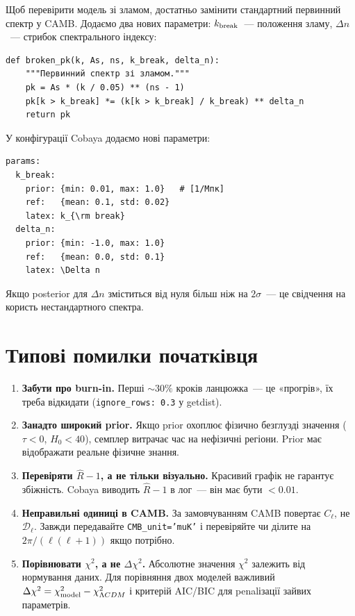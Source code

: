 Щоб перевірити модель зі зламом, достатньо замінити стандартний
первинний спектр у CAMB. Додаємо два нових параметри:
$k_{\rm break}$~--- положення зламу, $\Delta n$~--- стрибок
спектрального індексу:

\begin{verbatim}
def broken_pk(k, As, ns, k_break, delta_n):
    """Первинний спектр зі зламом."""
    pk = As * (k / 0.05) ** (ns - 1)
    pk[k > k_break] *= (k[k > k_break] / k_break) ** delta_n
    return pk
\end{verbatim}

У конфігурації Cobaya додаємо нові параметри:
\begin{verbatim}
params:
  k_break:
    prior: {min: 0.01, max: 1.0}   # [1/Мпк]
    ref:   {mean: 0.1, std: 0.02}
    latex: k_{\rm break}
  delta_n:
    prior: {min: -1.0, max: 1.0}
    ref:   {mean: 0.0, std: 0.1}
    latex: \Delta n
\end{verbatim}

Якщо posterior для $\Delta n$ зміститься від нуля більш ніж
на $2\sigma$~--- це свідчення на користь нестандартного спектра.

\section{Типові помилки початківця}

\begin{enumerate}
  \item \textbf{Забути про burn-in.} Перші $\sim 30\%$ кроків
        ланцюжка~--- це «прогрів», їх треба відкидати
        (\texttt{ignore\_rows: 0.3} у getdist).

  \item \textbf{Занадто широкий prior.} Якщо prior охоплює
        фізично безглузді значення ($\tau < 0$, $H_0 < 40$),
        семплер витрачає час на нефізичні регіони. Prior має
        відображати реальне фізичне знання.

  \item \textbf{Перевіряти $\hat{R}-1$, а не тільки візуально.}
        Красивий графік не гарантує збіжність. Cobaya виводить
        $\hat{R}-1$ в лог~--- він має бути $< 0.01$.

  \item \textbf{Неправильні одиниці в CAMB.} За замовчуванням
        CAMB повертає $C_\ell$, не $\mathcal{D}_\ell$. Завжди
        передавайте \texttt{CMB\_unit='muK'} і перевіряйте
        чи ділите на $2\pi/(\ell(\ell+1))$ якщо потрібно.

  \item \textbf{Порівнювати $\chi^2$, а не $\Delta\chi^2$.}
        Абсолютне значення $\chi^2$ залежить від нормування
        даних. Для порівняння двох моделей важливий
        $\Delta\chi^2 = \chi^2_{\rm model} - \chi^2_{\Lambda CDM}$
        і критерій AIC/BIC для penalізації зайвих параметрів.
\end{enumerate}

